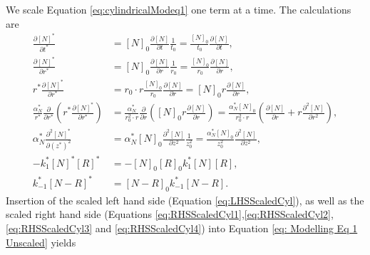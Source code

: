 \documentclass{article}
\begin{document}
We scale Equation \eqref{eq:cylindricalModeq1} one term at a time. The calculations are
\begin{align}
    \frac{\partial [N]^*}{\partial t^*} &= [N]_0 \frac{\partial [N]}{\partial t} \frac{1}{ t_0} = \frac{[N]_0}{ t_0} \frac{\partial [N]}{\partial t}, \label{eq:LHSScaledCyl}\\
    \frac{\partial [N]^*}{\partial r^*} &= [N]_0 \frac{\partial [N]}{\partial r} \frac{1}{r_0} = \frac{[N]_0}{r_0} \frac{\partial [N]}{\partial r}, \nonumber \\
    r^* \frac{\partial [N]^*}{\partial r^*} &= r_0 \cdot r \frac{[N]_0}{r_0} \frac{\partial [N]}{\partial r} = [N]_0 r \frac{\partial [N]}{\partial r}, \nonumber\\
    \frac{\alpha_N^*}{r^*} \frac{\partial}{\partial r^*} \left( r^* \frac{\partial [N]^*}{\partial r^*} \right) &= \frac{\alpha_N^*}{r_0^2 \cdot r} \frac{\partial}{\partial r} \left( [N]_0 r \frac{\partial [N]}{\partial r} \right) = \frac{\alpha_N^* [N]_0}{r_0^2 \cdot r} \left(\frac{\partial [N]}{\partial r} +  r \frac{\partial^2 [N]}{\partial r^2} \right),\label{eq:RHSScaledCyl1}\\
    \alpha_N^* \frac{\partial^2 [N]^*}{\partial (z^*)^2}  &= \alpha_N^* [N]_0 \frac{\partial^2 [N]}{\partial z^2} \frac{1}{z_0^2} =  \frac{\alpha_N^* [N]_0}{z_0^2}  \frac{\partial^2 [N]}{\partial z^2}, \label{eq:RHSScaledCyl2} \\
    -k_1^* [N]^* [R]^* &= - [N]_0 [R]_0 k_1^* [N] [R],\label{eq:RHSScaledCyl3} \\
    k_{-1}^* [N-R]^* &= [N-R]_0 k_{-1}^* [N-R]. \label{eq:RHSScaledCyl4}
\end{align}
Insertion of the scaled left hand side (Equation \eqref{eq:LHSScaledCyl}), as well as the scaled right hand side (Equations \eqref{eq:RHSScaledCyl1},\eqref{eq:RHSScaledCyl2},\eqref{eq:RHSScaledCyl3} and \eqref{eq:RHSScaledCyl4}) into Equation \eqref{eq: Modelling Eq 1 Unscaled} yields
\end{document}
